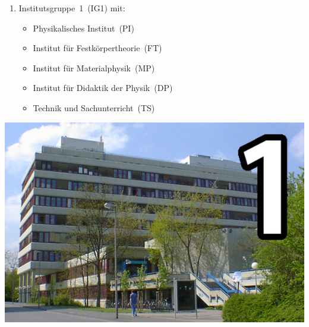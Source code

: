 {\large\RaggedRight
\begin{minipage}{0.54\textwidth}
	\begin{enumerate}[labelsep=*, leftmargin=1.2em, series=lageplan]
		\item Institutsgruppe~1~(IG1) mit:
		\begin{itemize}
			\item Physikalisches Institut~(PI)
			\item Institut für Festkörpertheorie~(FT)
			\item Institut für Materialphysik~(MP)
			\item Institut für Didaktik der Physik~(DP)
			\item Technik und Sachunterricht~(TS)
		\end{itemize}
	\end{enumerate}
\end{minipage}
\hfill
\begin{minipage}{0.45\textwidth}
	\centering
	\includegraphics[width=\textwidth]{res/lageplan/1_ig1.jpg}
\end{minipage}

\clearpage

}

